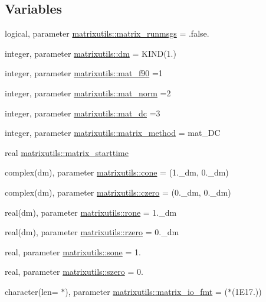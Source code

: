 \subsection*{Variables}
\begin{DoxyCompactItemize}
\item 
logical, parameter \mbox{\hyperlink{namespacematrixutils_a5c4836d18b8e1233dd130c5dc15e30fd}{matrixutils\+::matrix\+\_\+runmsgs}} = .false.
\item 
integer, parameter \mbox{\hyperlink{namespacematrixutils_a7bdc564986ea4d90f51201c75606ef3d}{matrixutils\+::dm}} = K\+I\+ND(1.)
\item 
integer, parameter \mbox{\hyperlink{namespacematrixutils_aacea55dcb267854e5e8df85c57122892}{matrixutils\+::mat\+\_\+f90}} =1
\item 
integer, parameter \mbox{\hyperlink{namespacematrixutils_a2ff32238b426e2f5a4e9d86da72402d2}{matrixutils\+::mat\+\_\+norm}} =2
\item 
integer, parameter \mbox{\hyperlink{namespacematrixutils_adc3f961dc571bc5ea1263f48e0574a79}{matrixutils\+::mat\+\_\+dc}} =3
\item 
integer, parameter \mbox{\hyperlink{namespacematrixutils_a7a9a7ea3dbe2beeff5a5f32de5f21dc3}{matrixutils\+::matrix\+\_\+method}} = mat\+\_\+\+DC
\item 
real \mbox{\hyperlink{namespacematrixutils_ab55e44d02787c32fab67dd16c8ebddef}{matrixutils\+::matrix\+\_\+starttime}}
\item 
complex(dm), parameter \mbox{\hyperlink{namespacematrixutils_a0a58a765b3eead806d9adb27694692d8}{matrixutils\+::cone}} = (1.\+\_\+dm, 0.\+\_\+dm)
\item 
complex(dm), parameter \mbox{\hyperlink{namespacematrixutils_a61466f9df90b39a99a491000d4419d75}{matrixutils\+::czero}} = (0.\+\_\+dm, 0.\+\_\+dm)
\item 
real(dm), parameter \mbox{\hyperlink{namespacematrixutils_ad1137ea4186d00583875a1e7e08a721f}{matrixutils\+::rone}} = 1.\+\_\+dm
\item 
real(dm), parameter \mbox{\hyperlink{namespacematrixutils_a0047cc2c6d161d05f23b748bb5b9a70a}{matrixutils\+::rzero}} = 0.\+\_\+dm
\item 
real, parameter \mbox{\hyperlink{namespacematrixutils_ae2555bb8da14eb27afe68ae794a858fb}{matrixutils\+::sone}} = 1.
\item 
real, parameter \mbox{\hyperlink{namespacematrixutils_ac00ea25825f3cb1ff949a87fad42094f}{matrixutils\+::szero}} = 0.
\item 
character(len= $\ast$), parameter \mbox{\hyperlink{namespacematrixutils_a34badd98b6ee7acb8ca038472adf2912}{matrixutils\+::matrix\+\_\+io\+\_\+fmt}} = \textquotesingle{}($\ast$(1\+E17.))\textquotesingle{}
\end{DoxyCompactItemize}
